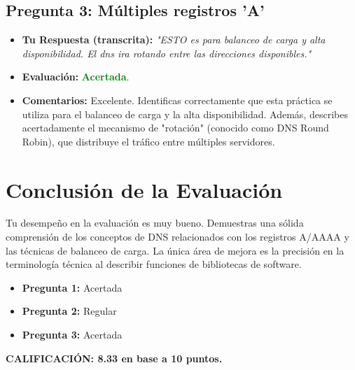 \documentclass{article}
\begin{document}
\subsection*{Pregunta 3: Múltiples registros 'A'}
\begin{itemize}
    \item \textbf{Tu Respuesta (transcrita):} \textit{"ESTO es para balanceo de carga y alta disponibilidad. El dns ira rotando entre las direcciones disponibles."}
    \item \textbf{Evaluación:} \textbf{\textcolor{green}{Acertada}}.
    \item \textbf{Comentarios:} Excelente. Identificas correctamente que esta práctica se utiliza para el balanceo de carga y la alta disponibilidad. Además, describes acertadamente el mecanismo de "rotación" (conocido como DNS Round Robin), que distribuye el tráfico entre múltiples servidores.
\end{itemize}

\section*{Conclusión de la Evaluación}

Tu desempeño en la evaluación es muy bueno. Demuestras una sólida comprensión de los conceptos de DNS relacionados con los registros A/AAAA y las técnicas de balanceo de carga. La única área de mejora es la precisión en la terminología técnica al describir funciones de bibliotecas de software.

\begin{itemize}
    \item \textbf{Pregunta 1:} Acertada
    \item \textbf{Pregunta 2:} Regular
    \item \textbf{Pregunta 3:} Acertada
\end{itemize}

\textbf{CALIFICACIÓN: 8.33 en base a 10 puntos.}
\end{document}
